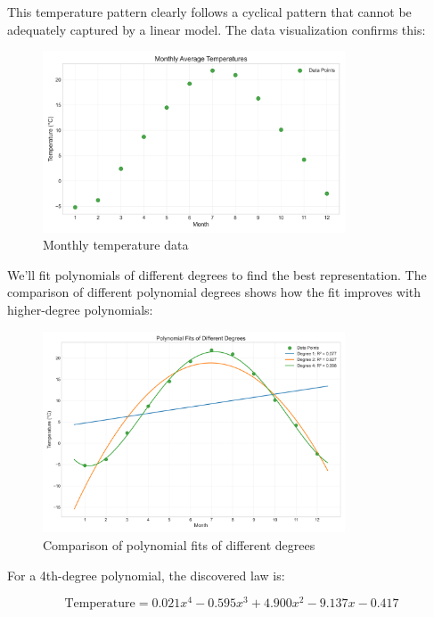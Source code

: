 \documentclass[12pt]{article}
\begin{document}
This temperature pattern clearly follows a cyclical pattern that cannot be adequately captured by a linear model. The data visualization confirms this:

\begin{figure}[H]
\centering
\includegraphics[width=0.8\textwidth]{temperature_data.png}
\caption{Monthly temperature data}
\label{fig:temperature_data}
\end{figure}

We'll fit polynomials of different degrees to find the best representation. The comparison of different polynomial degrees shows how the fit improves with higher-degree polynomials:

\begin{figure}[H]
\centering
\includegraphics[width=0.8\textwidth]{temperature_poly_comparison.png}
\caption{Comparison of polynomial fits of different degrees}
\label{fig:temperature_poly_comparison}
\end{figure}

For a 4th-degree polynomial, the discovered law is:

\begin{equation}
\text{Temperature} = 0.021x^4 - 0.595x^3 + 4.900x^2 - 9.137x - 0.417
\end{equation}
\end{document}

